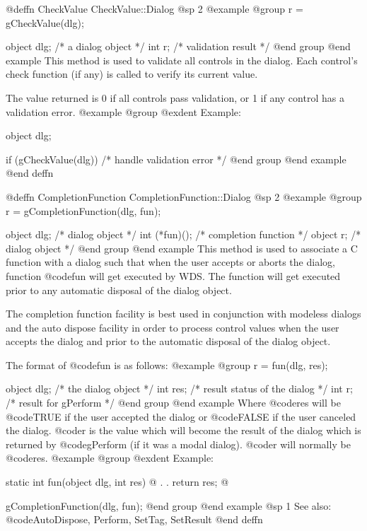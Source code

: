 @deffn {CheckValue} CheckValue::Dialog
@sp 2
@example
@group
r = gCheckValue(dlg);

object  dlg;   /*  a dialog object   */
int     r;     /*  validation result  */
@end group
@end example
This method is used to validate all controls in the dialog.  Each control's
check function (if any) is called to verify its current value.

The value returned is 0 if all controls pass validation, or 1 if any
control has a validation error.
@example
@group
@exdent Example:

object  dlg;

if (gCheckValue(dlg))
        /*  handle validation error  */
@end group
@end example
@end deffn




@deffn {CompletionFunction} CompletionFunction::Dialog
@sp 2
@example
@group
r = gCompletionFunction(dlg, fun);

object  dlg;       /*  dialog object        */
int     (*fun)();  /*  completion function  */
object  r;         /*  dialog object        */
@end group
@end example
This method is used to associate a C function with a dialog such that
when the user accepts or aborts the dialog, function @code{fun} will
get executed by WDS.  The function will get executed prior to any automatic
disposal of the dialog object.

The completion function facility is best used in conjunction with
modeless dialogs and the auto dispose facility in order to process
control values when the user accepts the dialog and prior to the
automatic disposal of the dialog object.

The format of @code{fun} is as follows:
@example
@group
r = fun(dlg, res);

object  dlg;    /*  the dialog object  */
int     res;    /*  result status of the dialog  */
int     r;      /*  result for gPerform  */
@end group
@end example
Where @code{res} will be @code{TRUE} if the user accepted the dialog or
@code{FALSE} if the user canceled the dialog.  @code{r} is the value
which will become the result of the dialog which is returned by @code{gPerform}
(if it was a modal dialog).  @code{r} will normally be @code{res}.
@example
@group
@exdent Example:

static  int     fun(object dlg, int res)
@{
        .
        .
        return res;
@}

        gCompletionFunction(dlg, fun);
@end group
@end example
@sp 1
See also:  @code{AutoDispose, Perform, SetTag, SetResult}
@end deffn














